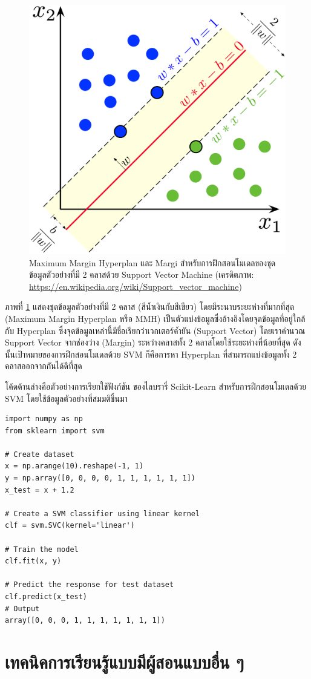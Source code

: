 \begin{figure}[H]
    \centering
    \includegraphics[width=0.4\linewidth]{fig/svm.png}
    \caption{Maximum Margin Hyperplan และ Margi สำหรับการฝึกสอนโมเดลของชุดข้อมูลตัวอย่างที่มี 2 คลาสด้วย Support Vector Machine (เครดิตภาพ: \url{https://en.wikipedia.org/wiki/Support_vector_machine})}
    \label{fig:svm_margin}
\end{figure}

ภาพที่ \ref{fig:svm_margin} แสดงชุดข้อมูลตัวอย่างที่มี 2 คลาส (สีน้ำเงินกับสีเขียว) โดยมีระนาบระยะห่างที่มากที่สุด (Maximum Margin Hyperplan หรือ MMH) เป็นตัวแบ่งข้อมูลซึ่งอ้างอิงโดยจุดข้อมูลที่อยู่ใกล้กับ Hyperplan ซึ่งจุดข้อมูลเหล่านี้มีชื่อเรียกว่าเวกเตอร์ค้ำยัน (Support Vector) โดยเราคำนวณ Support Vector จากช่องว่าง (Margin) ระหว่างคลาสทั้ง 2 คลาสโดยใช้ระยะห่างที่น้อยที่สุด ดังนั้นเป้าหมายของการฝึกสอนโมเดลด้วย SVM ก็คือการหา Hyperplan ที่สามารถแบ่งข้อมูลทั้ง 2 คลาสออกจากกันได้ดีที่สุด

โค้ดด้านล่างคือตัวอย่างการเรียกใช้ฟังก์ชัน  ของไลบรารี่ Scikit-Learn สำหรับการฝึกสอนโมเดลด้วย SVM โดยใช้ข้อมูลตัวอย่างที่สมมติขึ้นมา

\begin{lstlisting}[style=MyPython]
import numpy as np
from sklearn import svm

# Create dataset
x = np.arange(10).reshape(-1, 1)
y = np.array([0, 0, 0, 0, 1, 1, 1, 1, 1, 1])
x_test = x + 1.2

# Create a SVM classifier using linear kernel
clf = svm.SVC(kernel='linear')

# Train the model
clf.fit(x, y)

# Predict the response for test dataset
clf.predict(x_test)
# Output
array([0, 0, 0, 1, 1, 1, 1, 1, 1, 1])
\end{lstlisting}

\section{เทคนิคการเรียนรู้แบบมีผู้สอนแบบอื่น ๆ}
\label{sec:other_ml}

